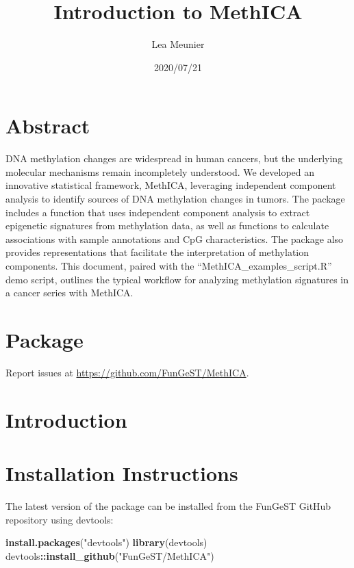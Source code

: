 \documentclass[]{article}
\title{Introduction to MethICA}
\author{Lea Meunier}
\date{2020/07/21}
\newenvironment{Shaded}{\begin{snugshade}}{\end{snugshade}}
\newcommand{\KeywordTok}[1]{\textcolor[rgb]{0.13,0.29,0.53}{\textbf{#1}}}
\newcommand{\StringTok}[1]{\textcolor[rgb]{0.31,0.60,0.02}{#1}}
\newcommand{\OperatorTok}[1]{\textcolor[rgb]{0.81,0.36,0.00}{\textbf{#1}}}
\newcommand{\NormalTok}[1]{#1}
\begin{document}
\maketitle

\section{Abstract}\label{abstract}

DNA methylation changes are widespread in human cancers, but the
underlying molecular mechanisms remain incompletely understood. We
developed an innovative statistical framework, MethICA, leveraging
independent component analysis to identify sources of DNA methylation
changes in tumors. The package includes a function that uses independent
component analysis to extract epigenetic signatures from methylation
data, as well as functions to calculate associations with sample
annotations and CpG characteristics. The package also provides
representations that facilitate the interpretation of methylation
components. This document, paired with the
``MethICA\_examples\_script.R'' demo script, outlines the typical
workflow for analyzing methylation signatures in a cancer series with
MethICA.

\section{Package}\label{package}

Report issues at \url{https://github.com/FunGeST/MethICA}.

\newpage

\section{Introduction}\label{introduction}

\section{Installation Instructions}\label{installation-instructions}

The latest version of the package can be installed from the FunGeST
GitHub repository using devtools:

\begin{Shaded}
\begin{Highlighting}[]
\KeywordTok{install.packages}\NormalTok{(}\StringTok{"devtools"}\NormalTok{)}
\KeywordTok{library}\NormalTok{(devtools)}
\NormalTok{devtools}\OperatorTok{::}\KeywordTok{install_github}\NormalTok{(}\StringTok{"FunGeST/MethICA"}\NormalTok{)}
\end{Highlighting}
\end{Shaded}
\end{document}
